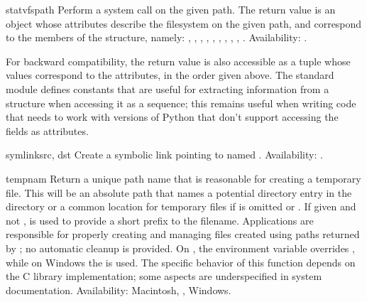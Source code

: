 \begin{funcdesc}{statvfs}{path}
Perform a  system call on the given path.  The
return value is an object whose attributes describe the filesystem on
the given path, and correspond to the members of the
 structure, namely:
,
,
,
,
,
,
,
,
,
.
Availability: \UNIX.

For backward compatibility, the return value is also accessible as a
tuple whose values correspond to the attributes, in the order given above.
The standard module 
defines constants that are useful for extracting information
from a  structure when accessing it as a sequence; this
remains useful when writing code that needs to work with versions of
Python that don't support accessing the fields as attributes.

\end{funcdesc}

\begin{funcdesc}{symlink}{src, dst}
Create a symbolic link pointing to  named .
Availability: \UNIX.
\end{funcdesc}

\begin{funcdesc}{tempnam}{}
Return a unique path name that is reasonable for creating a temporary
file.  This will be an absolute path that names a potential directory
entry in the directory  or a common location for temporary
files if  is omitted or .  If given and not
,  is used to provide a short prefix to the
filename.  Applications are responsible for properly creating and
managing files created using paths returned by ;
no automatic cleanup is provided.
On \UNIX, the environment variable  overrides
, while on Windows the  is used.  The specific
behavior of this function depends on the C library implementation;
some aspects are underspecified in system documentation.
  Availability: Macintosh, \UNIX, Windows.
\end{funcdesc}

